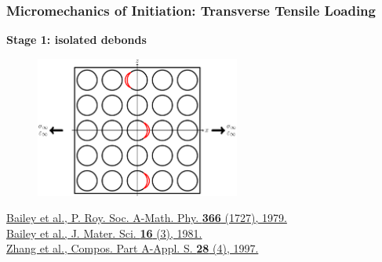 \documentclass[first,firstsupp,lastsupp,last,hyperref,table]{ETHclass}
\begin{document}
\begin{frame}
\frametitle{\vspace{0.2cm}\small Micromechanics of Initiation: Transverse Tensile Loading}
\vspace{-0.5cm}
\centering
\begin{alertblock}{\centering\scriptsize\bf Stage 1: isolated debonds}
\vspace{-0.25cm}
\begin{figure}
\centering
\includegraphics[width=0.6\textwidth]{stage1-isolateddebonds.pdf}
\end{figure}
\end{alertblock}
\vspace{-0.5cm}
\pgfmathsetmacro{}
\pgfmathsetmacro{}
{\fontsize{\fontsizeref}{\stretchref} \selectfont \href{https://doi.org/10.1098/rspa.1979.0071}{Bailey et al., P. Roy. Soc. A-Math. Phy. \textbf{366} (1727), 1979.}}\\\vspace{-5pt}
{\fontsize{\fontsizeref}{\stretchref} \selectfont \href{https://doi.org/10.1007/BF00552203}{Bailey et al., J. Mater. Sci. \textbf{16} (3), 1981.}}\\\vspace{-5pt}
{\fontsize{\fontsizeref}{\stretchref} \selectfont \href{https://doi.org/10.1016/S1359-835X(96)00123-6}{Zhang et al., Compos. Part A-Appl. S. \textbf{28} (4), 1997.}}
\end{frame}

\addtocounter{framenumber}{-1}
\end{document}
